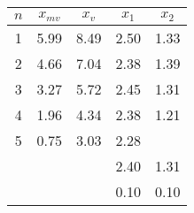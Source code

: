 \begin{tabular}[t]{
  S[table-format = 1.0]
  S[table-format = 2.2]
  S[table-format = 1.2] 
  S[table-format = 1.2] 
  S[table-format = 1.2] 
} \toprule
{$n$}            & {$x_{mv}$} & {$x_v$} & {$x_1$} & {$x_2$} \\                & 5.99     & 8.49    & 2.50    & 1.33    \\
2                & 4.66     & 7.04    & 2.38    & 1.39    \\
3                & 3.27     & 5.72    & 2.45    & 1.31    \\
4                & 1.96     & 4.34    & 2.38    & 1.21    \\
5                & 0.75     & 3.03    & 2.28    &         \\\midrule
{}  &          &         & 2.40    & 1.31    \\
{}   &          &         & 0.10    & 0.10    \\\bottomrule
\end{tabular}